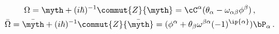 \begin{equation}
\begin{gathered}
\Omega=\myth+(i\hbar)^{-1}\commut{Z}{\myth}
=
\cC^\alpha(\theta_\alpha - \omega_{\alpha\beta}\phi^\beta)\,,
\\
\bar\Omega=\bar\myth+(i\hbar)^{-1}\commut{Z}{\bar\myth}
=
(\phi^\alpha + \theta_\beta \omega^{\beta\alpha} 
(-1)^{\ip{\alpha}})\bP_\alpha\,.
\end{gathered}\label{eq:solution-exp}
\end{equation}

